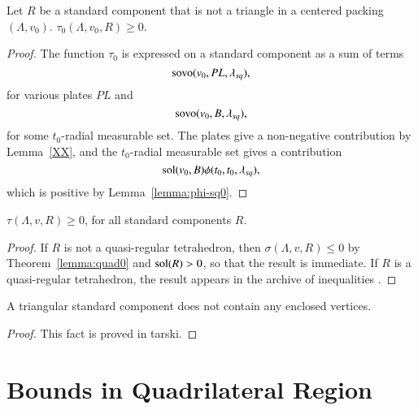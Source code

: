 \begin{lemma}
    \label{lemma:tau-positive}
    Let $R$ be a standard component that is not a triangle in a
    centered packing $(\Lambda,v_0)$.
    $\tau_{0}(\Lambda,v_0,R)\ge 0$.
\end{lemma}

\begin{proof}
The function $\tau_0$ is expressed on a standard component as a sum
of terms
  $$
  {\operatorname{sovo}}(v_0,PL,\lambda_{sq}),
  $$
for various plates $PL$ and
   $$
   {\operatorname{sovo}}(v_0,B,\lambda_{sq}),
   $$
for some $t_0$-radial measurable set.
The plates give a non-negative contribution by Lemma~\ref{XX},
and the $t_0$-radial measurable set gives a contribution
   $$
   \operatorname{sol}(v_0,B)\phi(t_0,t_0,\lambda_{sq}),
   $$
which is positive by Lemma~\ref{lemma:phi-sq0}.
\end{proof}


\begin{lemma}\label{lemma:roger0}
    $\tau(\Lambda,v,R)\ge 0$, for all standard components $R$.
\end{lemma}


\begin{proof}
If $R$ is not a quasi-regular tetrahedron, then $\sigma(\Lambda,v,R)\le0$
by Theorem~\ref{lemma:quad0} and $\operatorname{sol}(R)> 0$, so that the result
is immediate. If $R$ is a quasi-regular tetrahedron, the result
appears in the archive of inequalities .
\end{proof}



\begin{lemma}
        \label{lemma:no-enclosed-tri}
        A triangular standard component does not contain any enclosed
        vertices.
\end{lemma}

\begin{proof}
    This fact is proved in tarski.
\end{proof}



\section{Bounds in Quadrilateral Region}%
    \label{sec:bounds}



